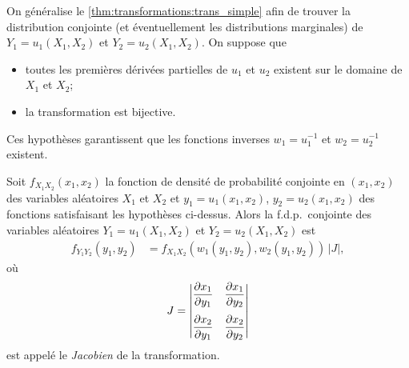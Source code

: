 On généralise le \autoref{thm:transformations:trans_simple} afin
de trouver la distribution conjointe (et éventuellement les
distributions marginales) de $Y_1 = u_1(X_1, X_2)$ et $Y_2 = u_2(X_1,
X_2)$. On suppose que
\begin{itemize}
\item toutes les premières dérivées partielles de $u_1$ et $u_2$
  existent sur le domaine de $X_1$ et $X_2$;
\item la transformation est bijective.
\end{itemize}
Ces hypothèses garantissent que les fonctions inverses $w_1 =
u_1^{-1}$ et $w_2 = u_2^{-1}$ existent.

\begin{thm}
  \label{thm:transformations:trans_multiple}
  Soit $f_{X_1 X_2}(x_1, x_2)$ la fonction de densité de probabilité
  con\-jointe en $(x_1, x_2)$ des variables aléatoires $X_1$ et $X_2$
  et $y_1 = u_1(x_1, x_2)$, $y_2 = u_2(x_1, x_2)$ des fonctions
  satisfaisant les hypothèses ci-dessus. Alors la f.d.p.\ conjointe
  des variables aléatoires $Y_1 = u_1(X_1, X_2)$ et $Y_2 = u_2(X_1,
  X_2)$ est
  \begin{align*}
    f_{Y_1 Y_2}(y_1, y_2)
    &= f_{X_1 X_2}(w_1(y_1, y_2), w_2(y_1, y_2))\, |J|,
  \end{align*}
  où
  \begin{displaymath}
    J =
    \begin{vmatrix}
      \displaystyle
      \frac{\partial x_1}{\partial y_1} &
      \displaystyle
      \frac{\partial x_1}{\partial y_2} \\[12pt]
      \displaystyle
      \frac{\partial x_2}{\partial y_1} &
      \displaystyle
      \frac{\partial x_2}{\partial y_2}
    \end{vmatrix}
  \end{displaymath}
  est appelé le \emph{Jacobien} de la transformation.
\end{thm}


